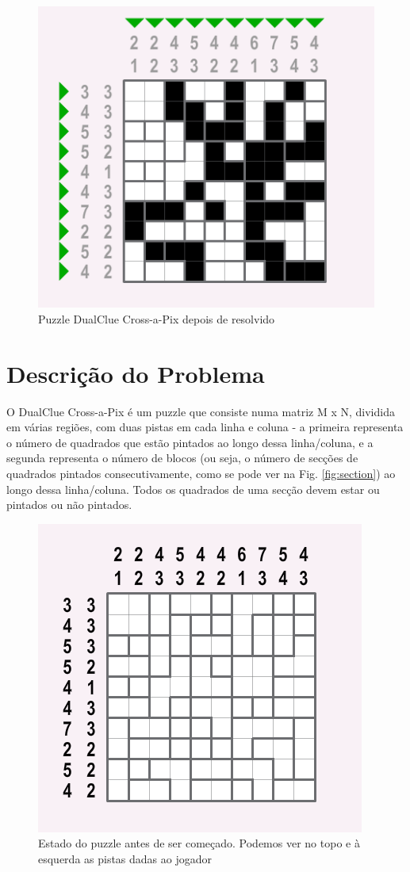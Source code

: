 \documentclass[runningheads,a4paper]{llncs}
\begin{document}
\begin{figure}[h]
\centering
\includegraphics[scale=0.5]{res/puzzlesolved.png}
\caption{Puzzle DualClue Cross-a-Pix depois de resolvido}
\label{fig:emptypuzzle}
\end{figure}

\section{Descrição do Problema}

O DualClue Cross-a-Pix é um puzzle que consiste numa matriz M x N, dividida em várias regiões, com duas pistas em cada linha e coluna - a primeira representa o número de quadrados que estão pintados ao longo dessa linha/coluna, e a segunda representa o número de blocos (ou seja, o número de secções de quadrados pintados consecutivamente, como se pode ver na Fig. \ref{fig:section}) ao longo dessa linha/coluna. Todos os quadrados de uma secção devem estar ou pintados ou não pintados.

\begin{figure}[h]
\centering
\includegraphics[scale=0.5]{res/emptypuzzle.png}
\caption{Estado do puzzle antes de ser começado. Podemos ver no topo e à esquerda as pistas dadas ao jogador}
\label{fig:emptypuzzle}
\end{figure}
\end{document}
